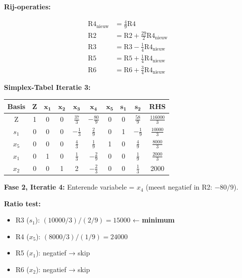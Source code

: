 \documentclass[a4paper,11pt]{article}
\begin{document}
\begin{oefenblok}
    \textbf{Rij-operaties:}

    \begin{align*}
        \text{R4}_{\text{nieuw}} & = \frac{4}{9}\text{R4} \\
        \text{R2} & = \text{R2} + \frac{29}{2}\text{R4}_{\text{nieuw}} \\
        \text{R3} & = \text{R3} - \frac{1}{4}\text{R4}_{\text{nieuw}} \\
        \text{R5} & = \text{R5} + \frac{1}{4}\text{R4}_{\text{nieuw}} \\
        \text{R6} & = \text{R6} + \frac{3}{4}\text{R4}_{\text{nieuw}}
    \end{align*}

    \textbf{Simplex-Tabel Iteratie 3:}

    \begin{center}
        \footnotesize
        \setlength{\tabcolsep}{3pt}
        \begin{tabular}{|c|c|c|c|c|c|c|c|c|c|}
            \hline
            \textbf{Basis} & \textbf{Z} & $\mathbf{x_1}$ & $\mathbf{x_2}$ & $\mathbf{x_3}$ & $\mathbf{x_4}$ & $\mathbf{x_5}$ & $\mathbf{s_1}$ & $\mathbf{s_2}$ & \textbf{RHS} \\
            \hline
            Z & 1 & 0 & 0 & $\frac{37}{3}$ & $-\frac{80}{9}$ & 0 & 0 & $\frac{58}{9}$ & $\frac{116000}{3}$ \\
            \hline
            $s_1$ & 0 & 0 & 0 & $-\frac{1}{3}$ & $\frac{2}{9}$ & 0 & 1 & $-\frac{1}{9}$ & $\frac{10000}{3}$ \\
            \hline
            $x_5$ & 0 & 0 & 0 & $\frac{4}{3}$ & $\frac{1}{9}$ & 1 & 0 & $\frac{4}{9}$ & $\frac{8000}{3}$ \\
            \hline
            $x_1$ & 0 & 1 & 0 & $\frac{1}{3}$ & $-\frac{2}{9}$ & 0 & 0 & $\frac{1}{9}$ & $\frac{2000}{3}$ \\
            \hline
            $x_2$ & 0 & 0 & 1 & 2 & $-\frac{2}{3}$ & 0 & 0 & $\frac{1}{3}$ & 2000 \\
            \hline
        \end{tabular}
    \end{center}

    \textbf{Fase 2, Iteratie 4:} Enterende variabele = $x_4$ (meest negatief in R2: $-80/9$).

    \textbf{Ratio test:}
    \begin{itemize}
        \item R3 ($s_1$): $(10000/3)/(2/9) = 15000$ ← \textbf{minimum}
        \item R4 ($x_5$): $(8000/3)/(1/9) = 24000$
        \item R5 ($x_1$): negatief → skip
        \item R6 ($x_2$): negatief → skip
    \end{itemize}


\end{oefenblok}
\end{document}
